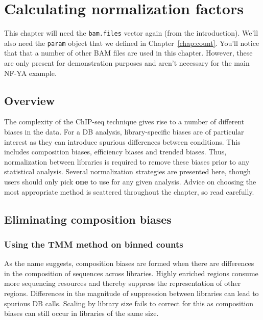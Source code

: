 \documentclass[12pt]{report}
\newcommand{\code}[1]{{\small\texttt{#1}}}
\newenvironment{combox}
{ \begin{shaded}\begin{center}\begin{minipage}[t]{0.95\textwidth} }
{ \end{minipage}\end{center}\end{shaded} }
\begin{document}

\chapter{Calculating normalization factors}
\label{chap:norm}
\begin{combox}
This chapter will need the \code{bam.files} vector again (from the introduction). 
We'll also need the \code{param} object that we defined in Chapter~\ref{chap:count}.
You'll notice that that a number of other BAM files are used in this chapter. 
However, these are only present for demonstration purposes and aren't necessary for the main NF-YA example.
\end{combox}

\section{Overview}
The complexity of the ChIP-seq technique gives rise to a number of different biases in the data.
For a DB analysis, library-specific biases are of particular interest as they can introduce spurious differences between conditions.
This includes composition biases, efficiency biases and trended biases.
Thus, normalization between libraries is required to remove these biases prior to any statistical analysis.
Several normalization strategies are presented here, though users should only pick \textbf{one} to use for any given analysis.
Advice on choosing the most appropriate method is scattered throughout the chapter, so read carefully.

\section{Eliminating composition biases}

\subsection{Using the TMM method on binned counts}
\label{sec:compo_norm}
As the name suggests, composition biases are formed when there are differences in the composition of sequences across libraries. 
Highly enriched regions consume more sequencing resources and thereby suppress the representation of other regions. 
Differences in the magnitude of suppression between libraries can lead to spurious DB calls. 
Scaling by library size fails to correct for this as composition biases can still occur in libraries of the same size. 
\end{document}
